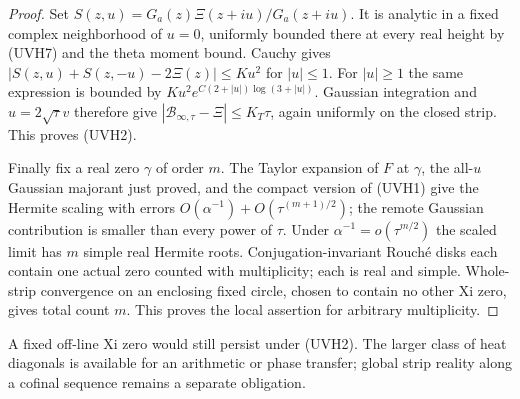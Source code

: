 \documentclass[11pt]{article}
\theoremstyle{remark}\newtheorem{remark}[theorem]{Remark}
\begin{document}
\begin{proof}
Set $S(z,u)=G_a(z)\Xi(z+iu)/G_a(z+iu)$.
It is analytic in a fixed complex neighborhood of $u=0$,
uniformly bounded there at every real height by (UVH7)
and the theta moment bound. Cauchy gives
$|S(z,u)+S(z,-u)-2\Xi(z)|\le K u^2$ for $|u|\le1$.
For $|u|\ge1$ the same expression is bounded by
$K u^2e^{C(2+|u|)\log(3+|u|)}$.
Gaussian integration and $u=2\sqrt\tau v$ therefore give
$|\mathcal B_{\infty,\tau}-\Xi|\le K_T\tau$,
again uniformly on the closed strip. This proves (UVH2).

Finally fix a real zero $\gamma$ of order $m$.
The Taylor expansion of $F$ at $\gamma$, the all-$u$ Gaussian
majorant just proved, and the compact version of (UVH1)
give the Hermite scaling with errors
$O(\alpha^{-1})+O(\tau^{(m+1)/2})$; the remote Gaussian
contribution is smaller than every power of $\tau$.
Under $\alpha^{-1}=o(\tau^{m/2})$ the scaled limit has
$m$ simple real Hermite roots. Conjugation-invariant
Rouch\'e disks each contain one actual zero counted with
multiplicity; each is real and simple.
Whole-strip convergence on an enclosing fixed circle,
chosen to contain no other Xi zero, gives total count $m$.
This proves the local assertion for arbitrary multiplicity.
\end{proof}

A fixed off-line Xi zero would still persist under (UVH2).
The larger class of heat diagonals is available for an arithmetic
or phase transfer; global strip reality along a cofinal sequence
remains a separate obligation.
\end{document}
